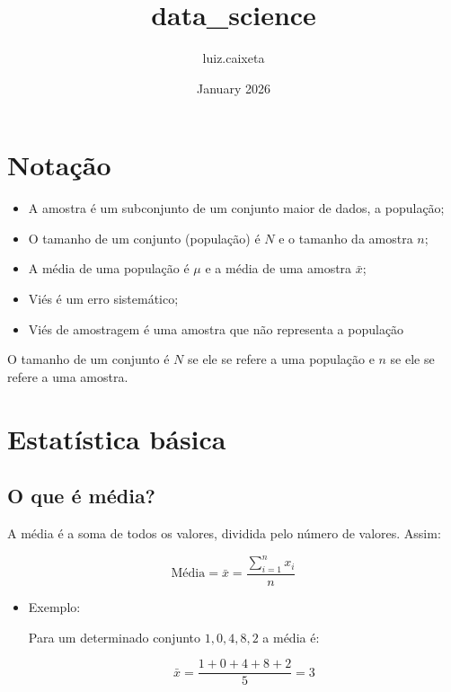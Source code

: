 \documentclass{article}
\title{data\_science}
\author{luiz.caixeta}
\date{January 2026}
\begin{document}
\maketitle
\newpage
\tableofcontents

\newpage
\section{Notação}

\begin{itemize}
    \item A amostra é um subconjunto de um conjunto maior de dados, a população;
    \item O tamanho de um conjunto (população) é $N$ e o tamanho da amostra $n$;
    \item A média de uma população é $\mu$ e a média de uma amostra $\bar{x}$;
    \item Viés é um erro sistemático;
    \item Viés de amostragem é uma amostra que não representa a população
\end{itemize}

O tamanho de um conjunto é $N$ se ele se refere a uma população e $n$ se ele se refere a uma amostra.

\section{Estatística básica}

\subsection{O que é média?}

A média é a soma de todos os valores, dividida pelo número de valores. Assim:

\begin{equation}
    \text{Média} = \bar{x} = \frac{\displaystyle \sum_{i=1}^{n} x_i}{n}
\end{equation}

\begin{itemize}
    \item Exemplo:

    Para um determinado conjunto ${1, 0, 4, 8, 2}$ a média é:

    \begin{equation*}
        \bar{x} = \frac{1 + 0 + 4 + 8 + 2}{5} = 3
    \end{equation*}
\end{itemize}
\end{document}
